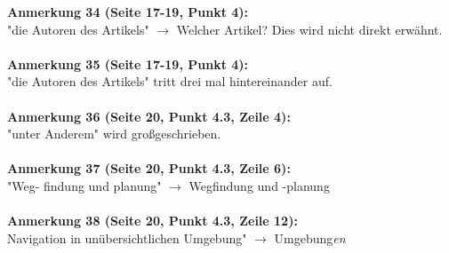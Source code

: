 \documentclass[a4paper,12pt]{book}
\begin{document}
\noindent
\textbf{Anmerkung 34 (Seite 17-19, Punkt 4):}\\
"die Autoren des Artikels" $\rightarrow$ Welcher Artikel? Dies wird nicht direkt erwähnt. \\
\\

\noindent
\textbf{Anmerkung 35 (Seite 17-19, Punkt 4):}\\
"die Autoren des Artikels" tritt drei mal hintereinander auf. \\
\\

\noindent
\textbf{Anmerkung 36 (Seite 20, Punkt 4.3, Zeile 4):}\\
"unter Anderem" wird großgeschrieben.\\
\\

\noindent
\textbf{Anmerkung 37 (Seite 20, Punkt 4.3, Zeile 6):}\\
"Weg- findung und planung" $\rightarrow$ Wegfindung und -planung \\
\\

\noindent
\textbf{Anmerkung 38 (Seite 20, Punkt 4.3, Zeile 12):}\\
Navigation in unübersichtlichen Umgebung" $\rightarrow$ Umgebung\emph{en} \\
\\
\end{document}
